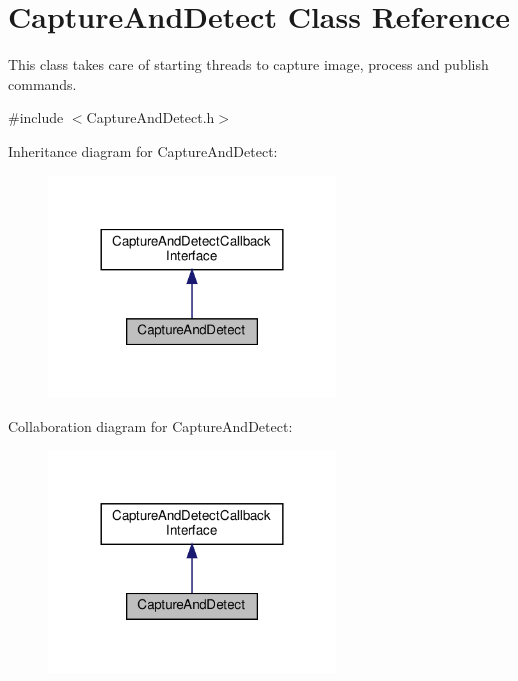 \hypertarget{classCaptureAndDetect}{}\section{Capture\+And\+Detect Class Reference}
\label{classCaptureAndDetect}


This class takes care of starting threads to capture image, process and publish commands.  




{\ttfamily \#include $<$Capture\+And\+Detect.\+h$>$}



Inheritance diagram for Capture\+And\+Detect\+:\nopagebreak
\begin{figure}[H]
\begin{center}
\leavevmode
\includegraphics[width=216pt]{classCaptureAndDetect__inherit__graph}
\end{center}
\end{figure}


Collaboration diagram for Capture\+And\+Detect\+:\nopagebreak
\begin{figure}[H]
\begin{center}
\leavevmode
\includegraphics[width=216pt]{classCaptureAndDetect__coll__graph}
\end{center}
\end{figure}
